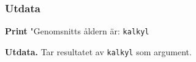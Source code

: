 \documentclass[../main.tex]{subfiles}
\begin{document}
\subsubsection{Utdata}

\begin{algorithm}[H]
\SetAlgoLined

\textbf{Print} "Genomsnitts åldern är: \texttt{kalkyl}
 
 \caption{\textbf{Utdata.} Tar resultatet av \texttt{kalkyl} som argument.}
 
\end{algorithm}
\end{document}

